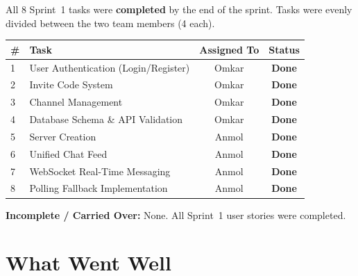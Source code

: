 \documentclass[11pt]{article}
\begin{document}
All 8 Sprint~1 tasks were \textbf{completed} by the end of the sprint. Tasks were evenly divided between the two team members (4 each).

\begin{center}
\begin{tabularx}{\textwidth}{@{}lXcc@{}}
\toprule
\textbf{\#} & \textbf{Task} & \textbf{Assigned To} & \textbf{Status} \\
\midrule
1 & User Authentication (Login/Register) & Omkar & \textbf{Done} \\
2 & Invite Code System & Omkar & \textbf{Done} \\
3 & Channel Management & Omkar & \textbf{Done} \\
4 & Database Schema \& API Validation & Omkar & \textbf{Done} \\
5 & Server Creation & Anmol & \textbf{Done} \\
6 & Unified Chat Feed & Anmol & \textbf{Done} \\
7 & WebSocket Real-Time Messaging & Anmol & \textbf{Done} \\
8 & Polling Fallback Implementation & Anmol & \textbf{Done} \\
\bottomrule
\end{tabularx}
\end{center}

\textbf{Incomplete / Carried Over:} None. All Sprint~1 user stories were completed.

\section{What Went Well}
\end{document}
